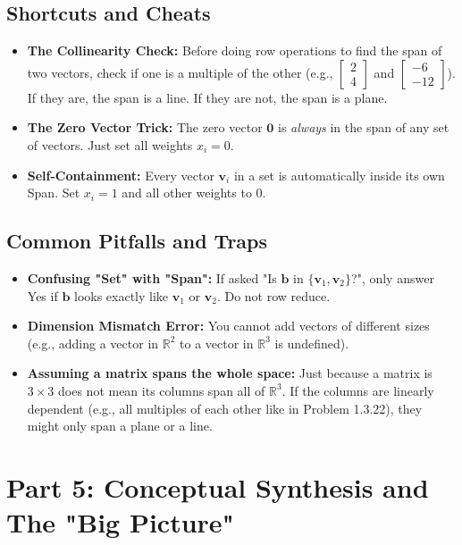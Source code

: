 \documentclass[11pt]{article}
\begin{document}
\subsection{Shortcuts and Cheats}
\begin{itemize}
    \item \textbf{The Collinearity Check:} Before doing row operations to find the span of two vectors, check if one is a multiple of the other (e.g., $\begin{bmatrix} 2 \\ 4 \end{bmatrix}$ and $\begin{bmatrix} -6 \\ -12 \end{bmatrix}$). If they are, the span is a line. If they are not, the span is a plane.
    \item \textbf{The Zero Vector Trick:} The zero vector $\mathbf{0}$ is \textit{always} in the span of any set of vectors. Just set all weights $x_i = 0$.
    \item \textbf{Self-Containment:} Every vector $\mathbf{v}_i$ in a set is automatically inside its own Span. Set $x_i = 1$ and all other weights to $0$.
\end{itemize}

\subsection{Common Pitfalls and Traps}
\begin{itemize}
    \item \textbf{Confusing "Set" with "Span":} If asked "Is $\mathbf{b}$ in $\{\mathbf{v}_1, \mathbf{v}_2\}$?", only answer Yes if $\mathbf{b}$ looks exactly like $\mathbf{v}_1$ or $\mathbf{v}_2$. Do not row reduce.
    \item \textbf{Dimension Mismatch Error:} You cannot add vectors of different sizes (e.g., adding a vector in $\mathbb{R}^2$ to a vector in $\mathbb{R}^3$ is undefined).
    \item \textbf{Assuming a matrix spans the whole space:} Just because a matrix is $3 \times 3$ does not mean its columns span all of $\mathbb{R}^3$. If the columns are linearly dependent (e.g., all multiples of each other like in Problem 1.3.22), they might only span a plane or a line.
\end{itemize}

\newpage
\section{Part 5: Conceptual Synthesis and The "Big Picture"}
\end{document}
